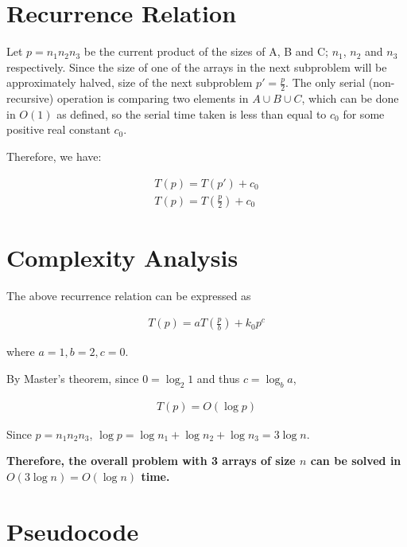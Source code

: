 \documentclass{article}
\begin{document}
\section{Recurrence Relation}

Let $p = n_1n_2n_3$ be the current product of the sizes of A, B and C; $n_1$, $n_2$ and $n_3$ respectively. Since the size of one of the arrays in the next subproblem will be approximately halved, size of the next subproblem $p' = \frac{p}{2}$. The only serial (non-recursive) operation is comparing two elements in $A \cup B \cup C$, which can be done in $O(1)$ as defined, so the serial time taken is less than equal to $c_0$ for some positive real constant $c_0$. 

Therefore, we have:

\begin{align*}
    T(p) = T(p') + c_0 \\
    T(p) = T(\frac{p}{2}) + c_0
\end{align*}

\section{Complexity Analysis}

The above recurrence relation can be expressed as 

\begin{align*}
    T(p) = aT(\frac{p}{b}) + k_0p^c
\end{align*}

where $a = 1, b = 2, c = 0$.

By Master's theorem, since $0 = \log_2{1}$ and thus $c = \log_b{a}$, 

\begin{align*}
    T(p) = O(\log p)
\end{align*}

Since $p = n_1n_2n_3$, $\log p = \log n_1 + \log n_2 + \log n_3 = 3 \log n$.

\textbf{Therefore, the overall problem with 3 arrays of size $n$ can be solved in $O(3 \log n) = O(\log n)$ time.} 

\section{Pseudocode}
\end{document}
